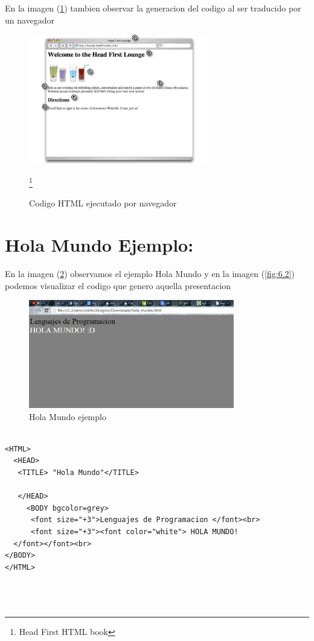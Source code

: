 \documentclass[11pt]{article} %
\begin{document}
\singlespace

\begin{center}
En la imagen (\ref{fig:5.2}) tambien observar la generacion del codigo al ser traducido por un navegador
\end{center}

\begin{figure}[htb]
\centering
\includegraphics[width=0.7\textwidth]{imagenes/img2.png}
\caption{Codigo HTML ejecutado por navegador}
\label{fig:5.2}
\footnote{Head First HTML book}
\end{figure}


\section{Hola Mundo Ejemplo:}

\begin{center}
En la imagen (\ref{fig:6.1}) observamos el ejemplo Hola Mundo y en la imagen  (\ref{fig:6.2}) podemos visualizar el codigo que genero aquella presentacion
\end{center}


\begin{figure}[htb]
\centering
\includegraphics[width=0.8\textwidth]{imagenes/Hola_Mundo.png}
\caption{Hola Mundo ejemplo}
\label{fig:6.1}
\end{figure}


\begin{center}

\end{center}

\begin{lstlisting}[frame=single]  % Start your code-block

<HTML>
  <HEAD>
   <TITLE> "Hola Mundo"</TITLE>

   </HEAD>
     <BODY bgcolor=grey>
      <font size="+3">Lenguajes de Programacion </font><br>
      <font size="+3"><font color="white"> HOLA MUNDO!
  </font></font><br>
</BODY>
</HTML>




\end{lstlisting}
\end{document}
